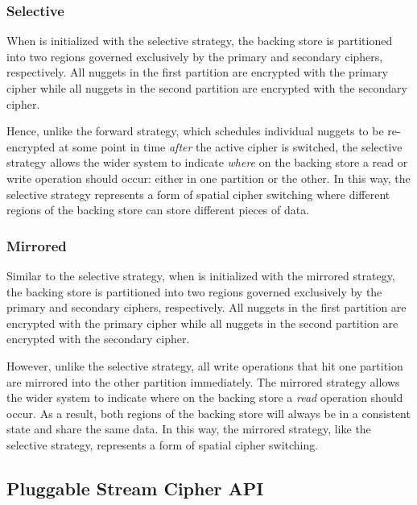 \subsubsection{Selective}

When \SYSTEM{} is initialized with the selective strategy, the backing store is
partitioned into two regions governed exclusively by the primary and secondary
ciphers, respectively. All nuggets in the first partition are encrypted with the
primary cipher while all nuggets in the second partition are encrypted with the
secondary cipher.

Hence, unlike the forward strategy, which schedules individual nuggets to be
re-encrypted at some point in time \emph{after} the active cipher is switched,
the selective strategy allows the wider system to indicate \emph{where} on the
backing store a read or write operation should occur: either in one partition or
the other. In this way, the selective strategy represents a form of spatial
cipher switching where different regions of the backing store can store
different pieces of data.

\subsubsection{Mirrored}

Similar to the selective strategy, when \SYSTEM{} is initialized with the
mirrored strategy, the backing store is partitioned into two regions governed
exclusively by the primary and secondary ciphers, respectively. All nuggets in
the first partition are encrypted with the primary cipher while all nuggets in
the second partition are encrypted with the secondary cipher.

However, unlike the selective strategy, all write operations that hit one
partition are mirrored into the other partition immediately. The mirrored
strategy allows the wider system to indicate where on the backing store a
\emph{read} operation should occur. As a result, both regions of the backing
store will always be in a consistent state and share the same data. In this way,
the mirrored strategy, like the selective strategy, represents a form of spatial
cipher switching.

\subsection{Pluggable Stream Cipher API}

